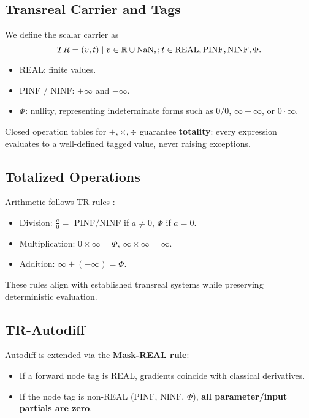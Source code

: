 \documentclass[11pt,twoside]{article}
\begin{document}
\subsection{Transreal Carrier and Tags}
We define the scalar carrier as
\[
TR = \\{ (v, t) \mid v \in \mathbb{R} \cup \\{\text{NaN}\\}, \\; t \in \\{\text{REAL}, \text{PINF}, \text{NINF}, \Phi\\}\\}.
\]
\begin{itemize}
  \item REAL: finite values.
  \item PINF / NINF: $+\infty$ and $-\infty$.
  \item $\Phi$: nullity, representing indeterminate forms such as $0/0$, $\infty-\infty$, or $0 \cdot \infty$.
\end{itemize}

Closed operation tables for $+, \times, \div$ guarantee \textbf{totality}: every expression evaluates to a well-defined tagged value, never raising exceptions.

\subsection{Totalized Operations}
Arithmetic follows TR rules \citep{dosreis2016transreal,bergstra2021wheel}:
\begin{itemize}
  \item Division: $\tfrac{a}{0} =$ PINF/NINF if $a \ne 0$, $\Phi$ if $a=0$.
  \item Multiplication: $0 \times \infty = \Phi$, $\infty \times \infty = \infty$.
  \item Addition: $\infty + (-\infty) = \Phi$.
\end{itemize}
These rules align with established transreal systems while preserving deterministic evaluation.

\subsection{TR-Autodiff}
Autodiff is extended via the \textbf{Mask-REAL rule}:
\begin{itemize}
  \item If a forward node tag is REAL, gradients coincide with classical derivatives.
  \item If the node tag is non-REAL (PINF, NINF, $\Phi$), \textbf{all parameter/input partials are zero}.
\end{itemize}
\end{document}
